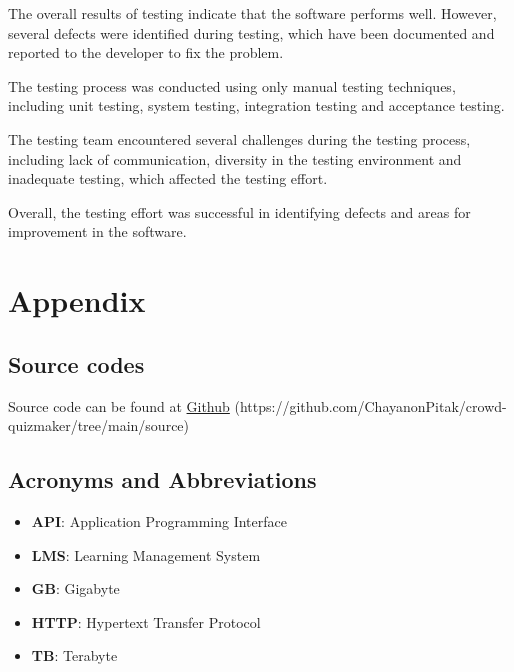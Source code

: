 \documentclass[ 10pt]{report}
\begin{document}
    The overall results of testing indicate that the software performs well. However, several defects were identified during testing, which have been documented and reported to the developer to fix the problem.
    
    The testing process was conducted using only manual testing techniques, including unit testing, system testing, integration testing and acceptance testing.
    
    The testing team encountered several challenges during the testing process, including lack of communication, diversity in the testing environment and inadequate testing, which affected the testing effort.
    
    Overall, the testing effort was successful in identifying defects and areas for improvement in the software.
    

    \chapter{Appendix}
        \section{Source codes}
        Source code can be found at \href{https://github.com/ChayanonPitak/crowd-quizmaker/tree/main/source}{Github} (https://github.com/ChayanonPitak/crowd-quizmaker/tree/main/source)
        \section{Acronyms and Abbreviations}
        \begin{itemize}
            \item \textbf{API}: Application Programming Interface
            \item \textbf{LMS}: Learning Management System
            \item \textbf{GB}: Gigabyte
            \item \textbf{HTTP}: Hypertext Transfer Protocol
            \item \textbf{TB}: Terabyte
        \end{itemize}
\end{document}
